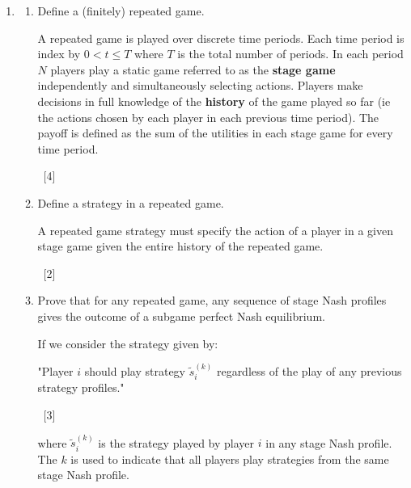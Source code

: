 \documentclass[12pt,a4paper]{article}
\begin{document}
\begin{enumerate}
\begin{enumerate}
\begin{enumerate}
\begin{enumerate}
                    Thus by the equality of payoffs theorem this is not a Nash
                    equilibrium.

                    ~\hfill{[2]}
                \end{enumerate}


            \end{enumerate}


    \end{enumerate}

\newpage
\item

    \begin{enumerate}
        \item Define a (finitely) repeated game.

            A repeated game is played over discrete time periods. Each time
            period is index by \(0<t\leq T\) where \(T\) is the total number of
            periods.  In each period \(N\) players play a static game referred
            to as the \textbf{stage game} independently and simultaneously
            selecting actions.  Players make decisions in full knowledge of the
            \textbf{history} of the game played so far (ie the actions chosen by
            each player in each previous time period).  The payoff is defined as
            the sum of the utilities in each stage game for every time period.

        ~\hfill[4]

        \item Define a strategy in a repeated game.

            A repeated game strategy must specify the action of a player in a given stage
            game given the entire history of the repeated game.

        ~\hfill[2]

        \item Prove that for any repeated game, any sequence of stage Nash profiles
            gives the outcome of a subgame perfect Nash equilibrium.

            If we consider the strategy given by:

            "Player \(i\) should play strategy \(\tilde s^{(k)}_i\) regardless of the play
            of any previous strategy profiles."

        ~\hfill[3]

            where \(\tilde s^{(k)}_i\) is the strategy played by player \(i\) in any stage
            Nash profile. The \(k\) is used to indicate that all players play strategies
            from the same stage Nash profile.


\end{enumerate}
\end{enumerate}
\end{document}
